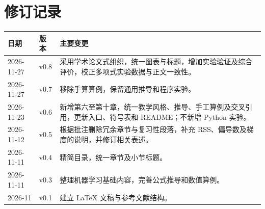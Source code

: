 \section{修订记录}\label{app:development-log}
\begin{longtable}{p{28mm}p{18mm}p{97mm}}
\toprule
日期&版本&主要变更\\\midrule\endhead
2026-11-27&v0.8&采用学术论文式组织，统一图表与标题，增加实验验证及综合评价，校正多项式实验数据与正文一致性。\\
2026-11-27&v0.7&移除手算算例，保留通用推导和程序实验。\\
2026-11-23&v0.6&新增第六至第十章，统一教学风格、推导、手工算例及交叉引用，更新入口、符号表和 README；不新增 Python 实验。\\
2026-11-12&v0.5&根据批注删除冗余章节与复习性段落，补充 RSS、偏导数及梯度的说明，并修订相关表述。\\
2026-11-11&v0.4&精简目录，统一章节及小节标题。\\
2026-11-11&v0.3&整理机器学习基础内容，完善公式推导和数值算例。\\
2026-11&v0.1&建立 LaTeX 文稿与参考文献结构。\\
\bottomrule
\end{longtable}
